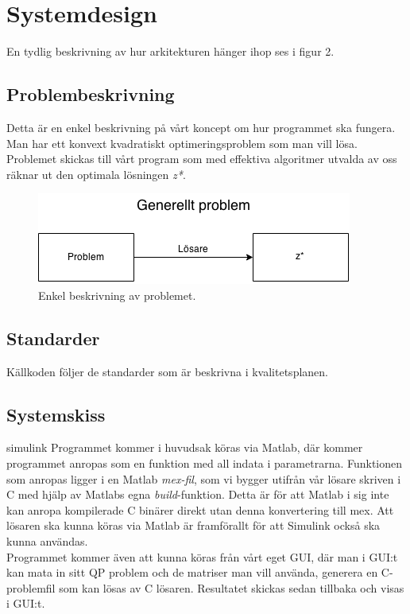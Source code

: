 \section{Systemdesign}

En tydlig beskrivning av hur arkitekturen hänger ihop ses i figur 2.

\subsection{Problembeskrivning}
Detta är en enkel beskrivning på vårt koncept om hur programmet ska fungera. Man har ett konvext kvadratiskt optimeringsproblem som man vill lösa. Problemet skickas till vårt program som med effektiva algoritmer utvalda av oss räknar ut den optimala lösningen \textit{z*}.

\begin{figure}[h]
	\begin{center}
		\includegraphics[scale=0.7]{bilder/Generellt.png}
	\end{center}
	\caption{Enkel beskrivning av problemet.}
\end{figure}

\subsection{Standarder}
Källkoden följer de standarder som är beskrivna i kvalitetsplanen.

\subsection{Systemskiss} simulink
Programmet kommer i huvudsak köras via Matlab, där kommer programmet anropas som en funktion med all indata i parametrarna. Funktionen som anropas ligger i en Matlab \textit{mex-fil}, som vi bygger utifrån vår lösare skriven i C med hjälp av Matlabs egna  \textit{build}-funktion. Detta är för att Matlab i sig inte kan anropa kompilerade C binärer direkt utan denna konvertering till mex. Att lösaren ska kunna köras via Matlab är framförallt för att Simulink också ska kunna användas.
\\
Programmet kommer även att kunna köras från vårt eget GUI, där man i GUI:t kan mata in sitt QP problem och de matriser man vill använda, generera en C-problemfil som kan lösas av C lösaren. Resultatet skickas sedan tillbaka och visas i GUI:t.

